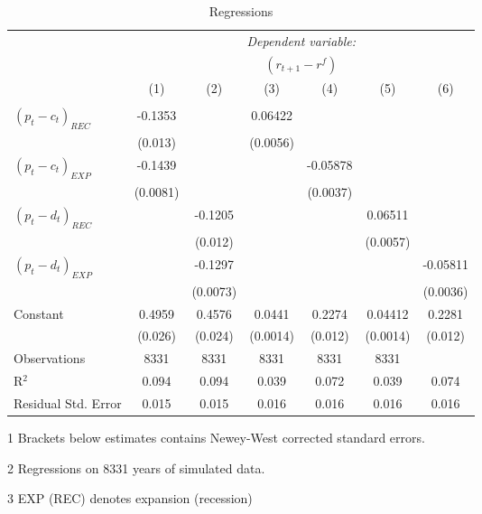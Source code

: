 \begin{table}[H]
\centering   
  \caption{Regressions}           
  \label{tab:regress2}     
  \begin{threeparttable}
\begin{tabular}{@{\hspace{5pt}}l@{\hspace{5pt}}cccccc} 
\toprule 
 & \multicolumn{6}{c}{\textit{Dependent variable:}} \\ 
 & \multicolumn{6}{c}{$\left(r_{t+1}-r^f\right)$} \\ 
 \cmidrule(rr){2-7}
 & (1) & (2) & (3) & (4) & (5) & (6) \\ 
\midrule  
\\[-2.1ex] $\left( p_t - c_t \right)_{REC}$ &-0.1353& &0.06422 & & &\\ 
  & (0.013) & &(0.0056) & & & \\ 
 \addlinespace 
  $\left( p_t - c_t \right)_{EXP}$ &-0.1439  &    & &-0.05878 & &  \\ 
  & (0.0081) & & &(0.0037) & & \\ 
 \addlinespace 
  $\left( p_t - d_t \right)_{REC}$ & &-0.1205& & & 0.06511  &   \\ 
                                   & &  (0.012) & & & (0.0057) &    \\ 
 \addlinespace 
  $\left( p_t - d_t \right)_{EXP}$ & &   -0.1297& & & &-0.05811 \\ 
                                   & &  (0.0073) & & & &(0.0036) \\ 
 \addlinespace 
 Constant &0.4959 &0.4576&0.0441 &0.2274 &0.04412 &0.2281 \\ 
          &(0.026) &(0.024)&(0.0014)&(0.012)&(0.0014)&(0.012) \\ 
 \addlinespace 
\midrule  
Observations & 8331 & 8331& 8331&8331&8331\\
R$^{2}$ &0.094 & 0.094&0.039&0.072&0.039&0.074 \\ 
Residual Std. Error &0.015 & 0.015&0.016&0.016&0.016&0.016 \\ 
\bottomrule 
\end{tabular} 
\begin{tablenotes}
\footnotesize{
\item[1] Brackets below estimates contains Newey-West corrected standard errors. 
\item[2] Regressions on 8331 years of simulated data.
\item[3] EXP (REC) denotes expansion (recession)
}
\end{tablenotes}
\end{threeparttable}
\end{table} 
